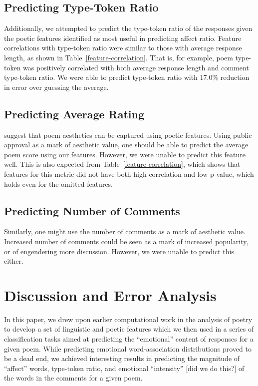 \documentclass[11pt]{article}
\begin{document}
\subsection{Predicting Type-Token Ratio}
Additionally, we attempted to predict the type-token ratio of the responses given the poetic features identified as most useful in predicting affect ratio. Feature correlations with type-token ratio were similar to those with average response length, as shown in Table~\ref{feature-correlation}. That is, for example, poem type-token was positively correlated with both average response length and comment type-token ratio. We were able to predict type-token ratio with 17.0\% reduction in error over guessing the average.

\subsection{Predicting Average Rating}
\cite{kao2012computational} suggest that poem aesthetics can be captured using poetic features. Using public approval as a mark of aesthetic value, one should be able to predict the average poem score using our features. However, we were unable to predict this feature well. This is also expected from Table~\ref{feature-correlation}, which shows that features for this metric did not have both high correlation and low p-value, which holds even for the omitted features.

\subsection{Predicting Number of Comments}
Similarly, one might use the number of comments as a mark of aesthetic value. Increased number of comments could be seen as a mark of increased popularity, or of engendering more discussion. However, we were unable to predict this either.

\section{Discussion and Error Analysis}
In this paper, we drew upon earlier computational work in the analysis of poetry to develop a set of linguistic and poetic features which we then used in a series of classification tasks aimed at predicting the ``emotional'' content of responses for a given poem. While predicting emotional word-association distributions proved to be a dead end, we achieved interesting results in predicting the magnitude of ``affect'' words, type-token ratio, and emotional ``intensity'' [did we do this?] of the words in the comments for a given poem.
\end{document}
